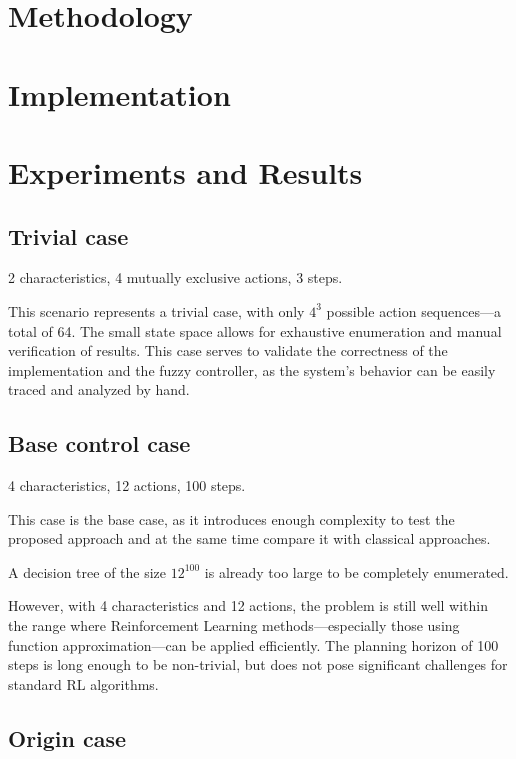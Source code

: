 \documentclass[11pt, a4paper]{article}
\begin{document}
	\section{Methodology}



	\section{Implementation}

	\section{Experiments and Results}

	\subsection{Trivial case}

	2 characteristics, 4 mutually exclusive actions, 3 steps.

	This scenario represents a trivial case, with only $4^{3}$ possible action sequences—a total of 64.
	The small state space allows for exhaustive enumeration and manual verification of results.
	This case serves to validate the correctness of the implementation and the fuzzy controller, as the system's behavior can be easily traced and analyzed by hand.

	\subsection{Base control case}
    
	4 characteristics, 12 actions, 100 steps.

	This case is the base case, as it introduces enough complexity to test the proposed approach and at the same time compare it with classical approaches.

	A decision tree of the size $12^{100}$ is already too large to be completely enumerated.

	However, with 4 characteristics and 12 actions, the problem is still well within the range where Reinforcement Learning methods—especially those using function approximation—can be applied efficiently.
	The planning horizon of 100 steps is long enough to be non-trivial, but does not pose significant challenges for standard RL algorithms.

	\subsection{Origin case}
\end{document}
